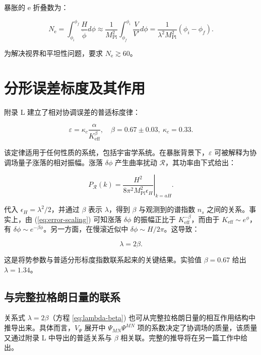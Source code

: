 \documentclass[11pt,a4paper]{article}
\newcommand{\eps}{\varepsilon}
\newcommand{\kappac}{\kappa_c}
\newcommand{\Keff}{K_{\mathrm{eff}}}
\newcommand{\Mpl}{M_{\mathrm{Pl}}}
\newcommand{\ninf}{N_{\mathrm{e}}}
\begin{document}
	暴胀的 e 折叠数为：
	
	\begin{equation}
		\ninf = \int_{\phi_i}^{\phi_f} \frac{H}{\dot{\phi}} d\phi \approx \frac{1}{\Mpl^2} \int_{\phi_f}^{\phi_i} \frac{V}{V'} d\phi = \frac{1}{\lambda^2 \Mpl^2} (\phi_i - \phi_f).
	\end{equation}
	
	为解决视界和平坦性问题，要求 \(\ninf \gtrsim 60\)。
	
	\section{分形误差标度及其作用}
	\label{sec:fractal}
	
	附录 L 建立了相对协调误差的普适标度律：
	
	\begin{equation}
		\eps = \kappac \frac{\alpha}{\Keff^{\beta}}, \quad \beta = 0.67 \pm 0.03,\ \kappac = 0.33.
		\label{eq:error-scaling}
	\end{equation}
	
	该定律适用于任何性质的系统，包括宇宙学系统。在暴胀背景下，\(\eps\) 可被解释为协调场量子涨落的相对振幅。涨落 \(\delta \phi\) 产生曲率扰动 \(\mathcal{R}\)，其功率由下式给出：
	
	\begin{equation}
		P_{\mathcal{R}}(k) = \left. \frac{H^2}{8\pi^2 \Mpl^2 \epsilon_H} \right|_{k=aH}.
	\end{equation}
	
	代入 \(\epsilon_H = \lambda^2/2\)，并通过 \(\beta\) 表示 \(\lambda\)，得到 \(\beta\) 与观测到的谱指数 \(n_s\) 之间的关系。事实上，由 (\ref{eq:error-scaling}) 可知涨落 \(\delta \phi\) 的振幅正比于 \(\Keff^{-\beta}\)，而由于 \(\Keff \sim e^{\phi}\)，有 \(\delta \phi \sim e^{-\beta \phi}\)。另一方面，在慢滚近似中 \(\delta \phi \sim H/2\pi\)。这导致：
	
	\begin{equation}
		\lambda = 2\beta.
		\label{eq:lambda-beta}
	\end{equation}
	
	这是将势参数与普适分形标度指数联系起来的关键结果。实验值 \(\beta = 0.67\) 给出 \(\lambda = 1.34\)。
	
	\subsection{与完整拉格朗日量的联系}
	
	关系式 \(\lambda = 2\beta\)（方程 \ref{eq:lambda-beta}) 也可从完整拉格朗日量的相互作用结构中推导出来。具体而言，\(V_{\Psi}\) 展开中 \(\Psi_{MN}\Psi^{MN}\) 项的系数决定了协调场的质量，该质量又通过附录 L 中导出的普适关系与 \(\beta\) 相关联。完整的推导将在另一篇工作中给出。
	
\end{document}
